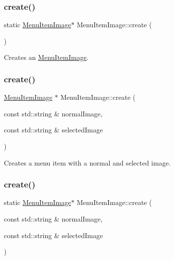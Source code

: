 \subsubsection{\texorpdfstring{create()}{create()}\hspace{0.1cm}{\footnotesize\ttfamily [2/14]}}
{\footnotesize\ttfamily static \hyperlink{classMenuItemImage}{Menu\+Item\+Image}$\ast$ Menu\+Item\+Image\+::create (\begin{DoxyParamCaption}{ }\end{DoxyParamCaption})\hspace{0.3cm}{\ttfamily [static]}}

Creates an \hyperlink{classMenuItemImage}{Menu\+Item\+Image}. \mbox{\label{classMenuItemImage_a0533ff2bb569d96e45dd25fc246a7bae}} 
\subsubsection{\texorpdfstring{create()}{create()}\hspace{0.1cm}{\footnotesize\ttfamily [3/14]}}
{\footnotesize\ttfamily \hyperlink{classMenuItemImage}{Menu\+Item\+Image} $\ast$ Menu\+Item\+Image\+::create (\begin{DoxyParamCaption}\item[{const std\+::string \&}]{normal\+Image,  }\item[{const std\+::string \&}]{selected\+Image }\end{DoxyParamCaption})\hspace{0.3cm}{\ttfamily [static]}}

Creates a menu item with a normal and selected image. \mbox{\label{classMenuItemImage_af7f7689def7d0eb1a8073b3a4293dd29}} 
\subsubsection{\texorpdfstring{create()}{create()}\hspace{0.1cm}{\footnotesize\ttfamily [4/14]}}
{\footnotesize\ttfamily static \hyperlink{classMenuItemImage}{Menu\+Item\+Image}$\ast$ Menu\+Item\+Image\+::create (\begin{DoxyParamCaption}\item[{const std\+::string \&}]{normal\+Image,  }\item[{const std\+::string \&}]{selected\+Image }\end{DoxyParamCaption})\hspace{0.3cm}{\ttfamily [static]}}


